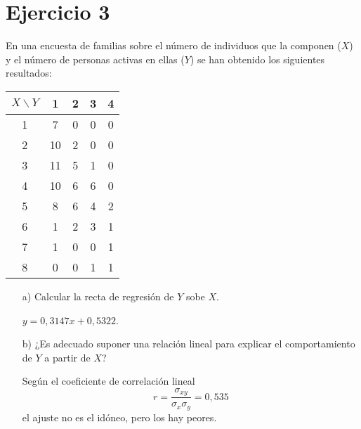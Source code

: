 \documentclass[10pt]{article}
\begin{document}
\section*{Ejercicio 3}

En una encuesta de familias sobre el número de individuos que la componen ($X$) y el número de personas activas en ellas ($Y$) se han obtenido los siguientes resultados:

\begin{center}
\begin{tabular}{c|cccc}
$X \backslash Y$ & 1 & 2 & 3 & 4 \\\hline
1 & 7 & 0 & 0 & 0 \\
2 & 10 & 2 & 0 & 0 \\
3 & 11 & 5 & 1 & 0 \\
4 & 10 & 6 & 6 & 0 \\
5 & 8 & 6 & 4 & 2 \\
6 & 1 & 2 & 3 & 1 \\
7 & 1 & 0 & 0 & 1 \\
8 & 0 & 0 & 1 & 1 \\
\end{tabular}
\end{center}

\begin{itemize}
\item[a)]Calcular la recta de regresión de $Y$ sobe $X$.

$y=0,3147x + 0,5322$.

\item[b)]¿Es adecuado suponer una relación lineal para explicar el comportamiento de $Y$ a partir de $X$?

Según el coeficiente de correlación lineal $$r = \frac{\sigma_{xy}}{\sigma_x\sigma_y} = 0,535$$ el ajuste no es el idóneo, pero los hay peores.

\end{itemize}
\end{document}
